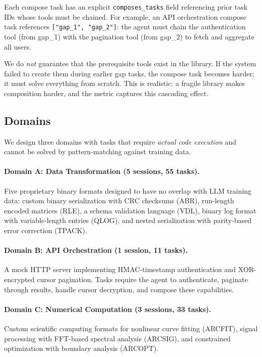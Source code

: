 \documentclass[sigplan,nonacm,natbib=false]{acmart}
\begin{document}
Each compose task has an explicit \texttt{composes\_tasks} field referencing prior task IDs whose tools must be chained. For example, an API orchestration compose task references \texttt{["gap\_1", "gap\_2"]}: the agent must chain the authentication tool (from gap\_1) with the pagination tool (from gap\_2) to fetch and aggregate all users.

We do \emph{not} guarantee that the prerequisite tools exist in the library. If the system failed to create them during earlier gap tasks, the compose task becomes harder; it must solve everything from scratch. This is realistic: a fragile library makes composition harder, and the metric captures this cascading effect.

\subsection{Domains}
\label{sec:domains}

We design three domains with tasks that require \emph{actual code execution} and cannot be solved by pattern-matching against training data.

\paragraph{Domain A: Data Transformation (5 sessions, 55 tasks).} Five proprietary binary formats designed to have no overlap with LLM training data: custom binary serialization with CRC checksums (ABR), run-length encoded matrices (RLE), a schema validation language (VDL), binary log format with variable-length entries (QLOG), and nested serialization with parity-based error correction (TPACK).

\paragraph{Domain B: API Orchestration (1 session, 11 tasks).} A mock HTTP server implementing HMAC-timestamp authentication and XOR-encrypted cursor pagination. Tasks require the agent to authenticate, paginate through results, handle cursor decryption, and compose these capabilities.

\paragraph{Domain C: Numerical Computation (3 sessions, 33 tasks).} Custom scientific computing formats for nonlinear curve fitting (ARCFIT), signal processing with FFT-based spectral analysis (ARCSIG), and constrained optimization with boundary analysis (ARCOPT).
\end{document}
